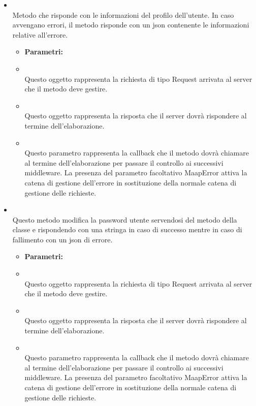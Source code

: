 \begin{itemize}
\begin{itemize}
\end{itemize}
\item[] \textbf{} \\ Metodo che risponde con le informazioni del profilo dell'utente. In caso avvengano errori, il metodo risponde con un json contenente le informazioni relative all'errore.
\begin{itemize}\addtolength{\itemsep}{-0.5\baselineskip}
\item[] \textbf{Parametri:}
\item[]  \\ Questo oggetto rappresenta la richiesta di tipo Request arrivata al server che il metodo deve gestire.
\item[]  \\ Questo oggetto rappresenta la risposta che il server dovrà rispondere al termine dell'elaborazione.
\item[]  \\ Questo parametro rappresenta la callback che il metodo dovrà chiamare al termine dell'elaborazione per passare il controllo ai successivi middleware. La presenza del parametro facoltativo MaapError attiva la catena di gestione dell'errore in sostituzione della normale catena di gestione delle richieste.
\end{itemize}
\item[] \textbf{} \\ Questo metodo modifica la password utente servendosi del metodo  della classe  e rispondendo con una stringa in caso di successo mentre in caso di fallimento con un json di errore.
\begin{itemize}\addtolength{\itemsep}{-0.5\baselineskip}
\item[] \textbf{Parametri:}
\item[]  \\ Questo oggetto rappresenta la richiesta di tipo Request arrivata al server che il metodo deve gestire.
\item[]  \\ Questo oggetto rappresenta la risposta che il server dovrà rispondere al termine dell'elaborazione.
\item[]  \\ Questo parametro rappresenta la callback che il metodo dovrà chiamare al termine dell'elaborazione per passare il controllo ai successivi middleware. La presenza del parametro facoltativo MaapError attiva la catena di gestione dell'errore in sostituzione della normale catena di gestione delle richieste.
\end{itemize}
\end{itemize}

